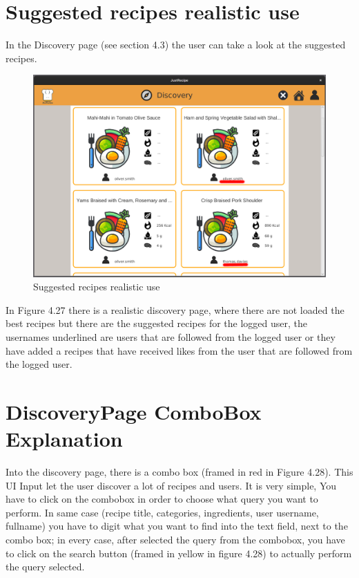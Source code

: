 \documentclass[a4paper]{report}
\begin{document}
\section{Suggested recipes realistic use}
In the Discovery page (see section 4.3) the user can take a look at the suggested recipes.
\begin{figure}[htpb]
	\centering
	\includegraphics[scale=0.37]{img/user_manual/properDiscoveryPage.png}
	\caption{Suggested recipes realistic use}
\end{figure}
In Figure 4.27 there is a realistic discovery page, where there are not loaded the best recipes but there are the suggested recipes for the logged user, the usernames underlined are users that are followed from the logged user or they have added a recipes that have received likes from the user that are followed from the logged user.

\section{DiscoveryPage ComboBox Explanation}
Into the discovery page, there is a combo box (framed in red in Figure 4.28).
This UI Input let the user discover a lot of recipes and users. It is very simple, You have to click on the combobox in order to choose what query you want to perform. In same case (recipe title, categories, ingredients, user username, fullname) you have to digit what you want to find into the text field, next to the combo box; in every case, after selected the query from the combobox, you have to click on the search button (framed in yellow in figure 4.28) to actually perform the query selected.
\end{document}
